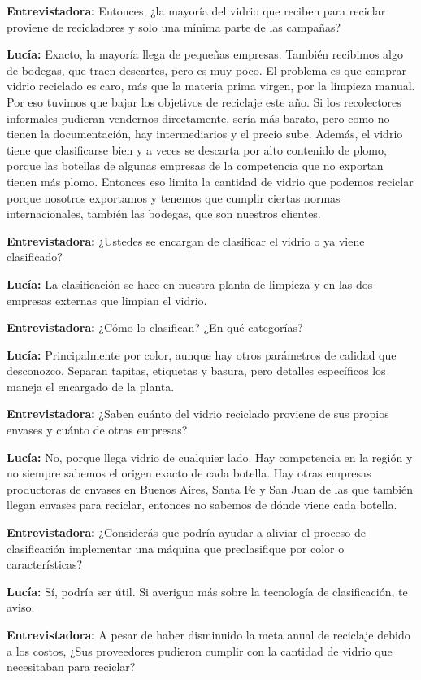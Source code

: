 \textbf{Entrevistadora:} Entonces, ¿la mayoría del vidrio que reciben para reciclar proviene de recicladores y solo una mínima parte de las campañas?

\textbf{Lucía:} Exacto, la mayoría llega de pequeñas empresas. También recibimos algo de bodegas, que traen descartes, pero es muy poco. El problema es que comprar vidrio reciclado es caro, más que la materia prima virgen, por la limpieza manual. Por eso tuvimos que bajar los objetivos de reciclaje este año. Si los recolectores informales pudieran vendernos directamente, sería más barato, pero como no tienen la documentación, hay intermediarios y el precio sube. Además, el vidrio tiene que clasificarse bien y a veces se descarta por alto contenido de plomo, porque las botellas de algunas empresas de la competencia que no exportan tienen más plomo. Entonces eso limita la cantidad de vidrio que podemos reciclar porque nosotros exportamos y tenemos que cumplir ciertas normas internacionales, también las bodegas, que son nuestros clientes.

\textbf{Entrevistadora:} ¿Ustedes se encargan de clasificar el vidrio o ya viene clasificado?

\textbf{Lucía:} La clasificación se hace en nuestra planta de limpieza y en las dos empresas externas que limpian el vidrio.

\textbf{Entrevistadora:} ¿Cómo lo clasifican? ¿En qué categorías?

\textbf{Lucía:} Principalmente por color, aunque hay otros parámetros de calidad que desconozco. Separan tapitas, etiquetas y basura, pero detalles específicos los maneja el encargado de la planta.

\textbf{Entrevistadora:} ¿Saben cuánto del vidrio reciclado proviene de sus propios envases y cuánto de otras empresas?

\textbf{Lucía:} No, porque llega vidrio de cualquier lado. Hay competencia en la región y no siempre sabemos el origen exacto de cada botella. Hay otras empresas productoras de envases en Buenos Aires, Santa Fe y San Juan de las que también llegan envases para reciclar, entonces no sabemos de dónde viene cada botella.

\textbf{Entrevistadora:} ¿Considerás que podría ayudar a aliviar el proceso de clasificación implementar una máquina que preclasifique por color o características?

\textbf{Lucía:} Sí, podría ser útil. Si averiguo más sobre la tecnología de clasificación, te aviso.

\textbf{Entrevistadora:} A pesar de haber disminuido la meta anual de reciclaje debido a los costos, ¿Sus proveedores pudieron cumplir con la cantidad de vidrio que necesitaban para reciclar?

